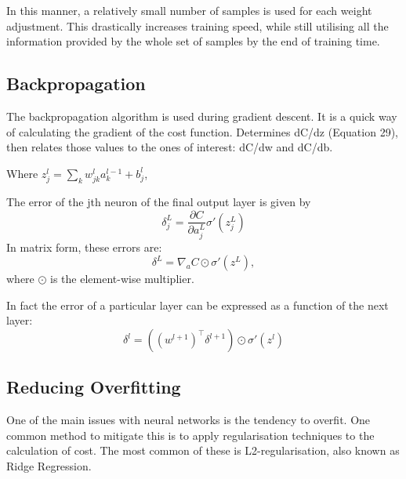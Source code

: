 \documentclass[honours,12pt]{unswthesis}
\numberwithin{equation}{section}
\begin{document}
In this manner, a relatively small number of samples is used for each weight adjustment. This drastically increases training speed, while still utilising all the information provided by the whole set of samples by the end of training time.

%
%
%


\subsection{Backpropagation}

The backpropagation algorithm is used during gradient descent. It is a quick way of calculating the gradient of the cost function.
Determines dC/dz (Equation 29), then relates those values to the ones of interest: dC/dw and dC/db.

Where $z_j^l = \sum_k w_{jk}^la_k^{l-1} + b_j^l$,

The error of the jth neuron of the final output layer is given by
\[
	\delta_j^L = \dfrac{\partial C}{\partial a_j^L}\sigma'(z_j^L)
\]
In matrix form, these errors are:
\[
	\delta^L = \nabla_aC\odot \sigma'(z^L),
\]
where $\odot$ is the element-wise multiplier.

In fact the error of a particular layer can be expressed as a function of the next layer:
\[
	\delta^l = ((w^{l+1})^\top \delta^{l+1})\odot\sigma'(z^l)
\]


\subsection{Reducing Overfitting}


One of the main issues with neural networks is the tendency to overfit. One common method to mitigate this is to apply regularisation techniques to the calculation of cost. The most common of these is L2-regularisation, also known as Ridge Regression.
\end{document}
